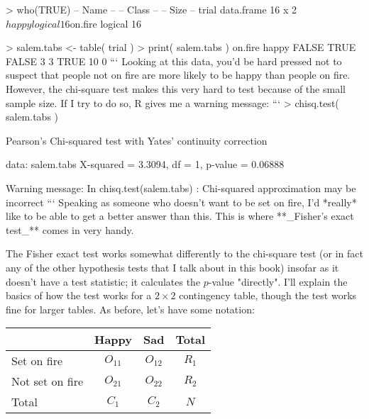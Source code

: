 > who(TRUE)
   -- Name --   -- Class --   -- Size --
   trial        data.frame    16 x 2    
    $happy      logical       16        
    $on.fire    logical       16       

> salem.tabs <- table( trial )
> print( salem.tabs )
       on.fire
happy   FALSE TRUE
  FALSE     3    3
  TRUE     10    0
```
Looking at this data, you'd be hard pressed not to suspect that people not on fire are more likely to be happy than people on fire. However, the chi-square test makes this very hard to test because of the small sample size. If I try to do so, R gives me a warning message:
```
> chisq.test( salem.tabs )

	Pearson's Chi-squared test with Yates' continuity correction

data:  salem.tabs 
X-squared = 3.3094, df = 1, p-value = 0.06888

Warning message:
In chisq.test(salem.tabs) : Chi-squared approximation may be incorrect
```
Speaking as someone who doesn't want to be set on fire, I'd *really* like to be able to get a better answer than this. This is where **_Fisher's exact test_** \cite{Fisher1922} comes in very handy. 

The Fisher exact test works somewhat differently to the chi-square test (or in fact any of the other hypothesis tests that I talk about in this book) insofar as it doesn't have a test statistic; it calculates the $p$-value "directly". I'll explain the basics of how the test works for a $2 \times 2$ contingency table, though the test works fine for larger tables. As before, let's have some notation: 

\begin{center}
\begin{tabular}{l|cc|c}
& Happy & Sad & Total \\ \hline
Set on fire   & $O_{11}$ & $O_{12}$ & $R_{1}$ \\
Not set on fire & $O_{21}$ & $O_{22}$ & $R_{2}$ \\ \hline
Total & $C_{1}$ & $C_{2}$ & $N$
\end{tabular}
\end{center}


